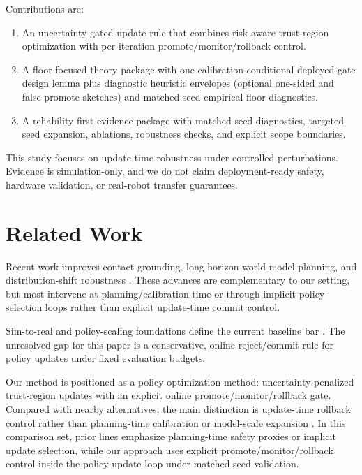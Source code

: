 \documentclass[letterpaper,10pt,conference]{ieeeconf}
\begin{document}
Contributions are:
\begin{enumerate}
    \item An uncertainty-gated update rule that combines risk-aware trust-region optimization with per-iteration promote/monitor/rollback control.
    \item A floor-focused theory package with one calibration-conditional deployed-gate design lemma plus diagnostic heuristic envelopes (optional one-sided and false-promote sketches) and matched-seed empirical-floor diagnostics.
    \item A reliability-first evidence package with matched-seed diagnostics, targeted seed expansion, ablations, robustness checks, and explicit scope boundaries.
\end{enumerate}

This study focuses on update-time robustness under controlled perturbations. Evidence is simulation-only, and we do not claim deployment-ready safety, hardware validation, or real-robot transfer guarantees.

\section{Related Work}

Recent work improves contact grounding, long-horizon world-model planning, and distribution-shift robustness \cite{a2602_13833v1,a2602_14174v1,a2602_12532v1,a2602_12063v2,a2602_13977v1,a2602_10983v2,a2602_12047v1,a2602_12616v1,a2602_09021v1}. These advances are complementary to our setting, but most intervene at planning/calibration time or through implicit policy-selection loops rather than explicit update-time commit control.

Sim-to-real and policy-scaling foundations define the current baseline bar \cite{tobin2017domain,kalashnikov2018qtopt,andrychowicz2018dexterous,mandlekar2021robomimic,brohan2022rt1,brohan2023rt2,openx2024rtx,chi2023diffusionpolicy}. The unresolved gap for this paper is a conservative, online reject/commit rule for policy updates under fixed evaluation budgets.

Our method is positioned as a policy-optimization method: uncertainty-penalized trust-region updates with an explicit online promote/monitor/rollback gate. Compared with nearby alternatives, the main distinction is update-time rollback control rather than planning-time calibration or model-scale expansion \cite{a2602_12047v1,a2602_12616v1,a2602_12063v2,a2602_13977v1,a2602_10983v2,a2602_12532v1,a2602_14174v1,a2602_15010v1}.
In this comparison set, prior lines emphasize planning-time safety proxies or implicit update selection, while our approach uses explicit promote/monitor/rollback control inside the policy-update loop under matched-seed validation.
\end{document}
